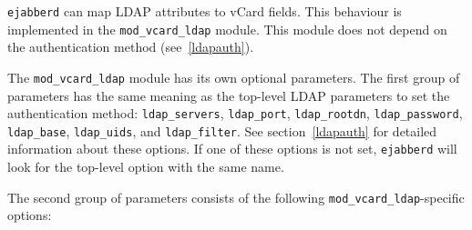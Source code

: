 \documentclass[a4paper,10pt]{book}
\newcommand{\option}[1]{\texttt{#1}}
\newcommand{\ejabberd}{\texttt{ejabberd}}
\newcommand{\module}[1]{\texttt{#1}}
\newcommand{\modvcardldap}{\module{mod\_vcard\_ldap}}
\begin{document}

\ejabberd{} can map LDAP attributes to vCard fields. This behaviour is
implemented in the \modvcardldap{} module. This module does not depend on the
authentication method (see~\ref{ldapauth}).

The \modvcardldap{} module has
its own optional parameters. The first group of parameters has the same
meaning as the top-level LDAP parameters to set the authentication method:
\option{ldap\_servers}, \option{ldap\_port}, \option{ldap\_rootdn},
\option{ldap\_password}, \option{ldap\_base}, \option{ldap\_uids}, and
\option{ldap\_filter}. See section~\ref{ldapauth} for detailed information
about these options. If one of these options is not set, \ejabberd{} will look
for the top-level option with the same name.

The second group of parameters
consists of the following \modvcardldap{}-specific options:
\end{document}
